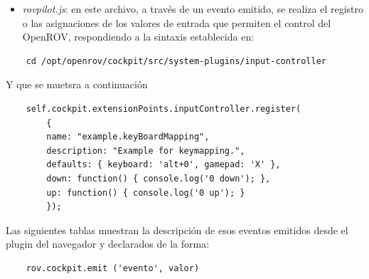 \begin{itemize}
    \item \textit{rovpilot.js}: en este archivo, a través de un evento 
    emitido, se realiza el registro o las asignaciones de los valores de entrada que permiten el control del OpenROV, respondiendo a la sintaxis establecida en:
\end{itemize}


\begin{verbatim}
    cd /opt/openrov/cockpit/src/system-plugins/input-controller
\end{verbatim}
\par Y que se muetsra a continuación
\begin{verbatim}
    self.cockpit.extensionPoints.inputController.register(
        {
        name: "example.keyBoardMapping",
        description: "Example for keymapping.",
        defaults: { keyboard: 'alt+0', gamepad: 'X' },
        down: function() { console.log('0 down'); },
        up: function() { console.log('0 up'); }
        });
\end{verbatim}

Las siguientes tablas muestran la descripción de esos eventos emitidos desde el plugin del navegador y declarados de la forma:
\begin{verbatim}
    rov.cockpit.emit ('evento', valor)
\end{verbatim}

